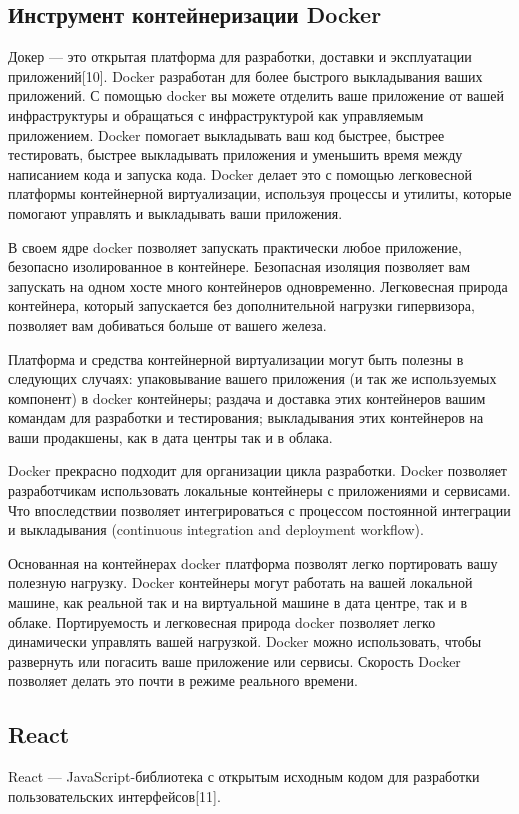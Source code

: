 \subsection{Инструмент контейнеризации Docker}
Докер — это открытая платформа для разработки, доставки и эксплуатации приложений[10].
Docker разработан для более быстрого выкладывания ваших приложений.
С помощью docker вы можете отделить ваше приложение от вашей инфраструктуры и обращаться с инфраструктурой как управляемым приложением.
Docker помогает выкладывать ваш код быстрее, быстрее тестировать, быстрее выкладывать приложения и уменьшить время между написанием кода и запуска кода.
Docker делает это с помощью легковесной платформы контейнерной виртуализации, используя процессы и утилиты, которые помогают управлять и выкладывать ваши приложения.

В своем ядре docker позволяет запускать практически любое приложение, безопасно изолированное в контейнере.
Безопасная изоляция позволяет вам запускать на одном хосте много контейнеров одновременно.
Легковесная природа контейнера, который запускается без дополнительной нагрузки гипервизора, позволяет вам добиваться больше от вашего железа.

Платформа и средства контейнерной виртуализации могут быть полезны в следующих случаях: упаковывание вашего приложения (и так же используемых компонент) в docker контейнеры; раздача и доставка этих контейнеров вашим командам для разработки и тестирования; выкладывания этих контейнеров на ваши продакшены, как в дата центры так и в облака.

Docker прекрасно подходит для организации цикла разработки.
Docker позволяет разработчикам использовать локальные контейнеры с приложениями и сервисами. Что впоследствии позволяет интегрироваться с процессом постоянной интеграции и выкладывания (continuous integration and deployment workflow).

Основанная на контейнерах docker платформа позволят легко портировать вашу полезную нагрузку.
Docker контейнеры могут работать на вашей локальной машине, как реальной так и на виртуальной машине в дата центре, так и в облаке.
Портируемость и легковесная природа docker позволяет легко динамически управлять вашей нагрузкой.
Docker можно использовать, чтобы развернуть или погасить ваше приложение или сервисы. Скорость Docker позволяет делать это почти в режиме реального времени.

\subsection{React}
React — JavaScript-библиотека с открытым исходным кодом для разработки пользовательских интерфейсов[11].

